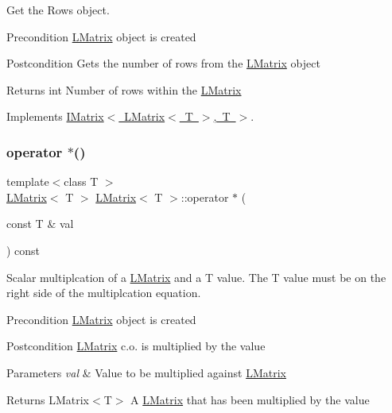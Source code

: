Get the Rows object. 

\begin{DoxyPrecond}{Precondition}
\mbox{\hyperlink{class_l_matrix}{L\+Matrix}} object is created 
\end{DoxyPrecond}
\begin{DoxyPostcond}{Postcondition}
Gets the number of rows from the \mbox{\hyperlink{class_l_matrix}{L\+Matrix}} object 
\end{DoxyPostcond}
\begin{DoxyReturn}{Returns}
int Number of rows within the \mbox{\hyperlink{class_l_matrix}{L\+Matrix}} 
\end{DoxyReturn}


Implements \mbox{\hyperlink{class_i_matrix}{I\+Matrix$<$ L\+Matrix$<$ T $>$, T $>$}}.

\mbox{\label{class_l_matrix_ac8df9082c434b41a98d26defb95ea388}} 
\subsubsection{\texorpdfstring{operator $\ast$()}{operator *()}}
{\footnotesize\ttfamily template$<$class T $>$ \\
\mbox{\hyperlink{class_l_matrix}{L\+Matrix}}$<$ T $>$ \mbox{\hyperlink{class_l_matrix}{L\+Matrix}}$<$ T $>$\+::operator $\ast$ (\begin{DoxyParamCaption}\item[{const T \&}]{val }\end{DoxyParamCaption}) const\hspace{0.3cm}{\ttfamily [virtual]}}



Scalar multiplcation of a \mbox{\hyperlink{class_l_matrix}{L\+Matrix}} and a T value. The T value must be on the right side of the multiplcation equation. 

\begin{DoxyPrecond}{Precondition}
\mbox{\hyperlink{class_l_matrix}{L\+Matrix}} object is created 
\end{DoxyPrecond}
\begin{DoxyPostcond}{Postcondition}
\mbox{\hyperlink{class_l_matrix}{L\+Matrix}} c.\+o. is multiplied by the value 
\end{DoxyPostcond}

\begin{DoxyParams}{Parameters}
{\em val} & Value to be multiplied against \mbox{\hyperlink{class_l_matrix}{L\+Matrix}} \\
\hline
\end{DoxyParams}
\begin{DoxyReturn}{Returns}
L\+Matrix$<$\+T$>$ A \mbox{\hyperlink{class_l_matrix}{L\+Matrix}} that has been multiplied by the value 
\end{DoxyReturn}


